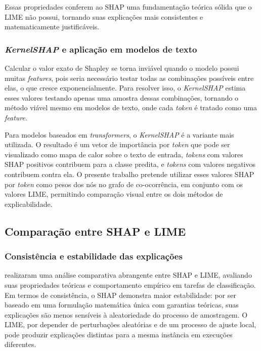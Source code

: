 \documentclass[
    12pt,                %
    openright,           %
    oneside,             %
    a4paper,             %
    english,             %
    brazil               %
]{abntex2}
\begin{document}
Essas propriedades conferem ao SHAP uma fundamentação teórica sólida que o LIME não possui, tornando suas explicações mais consistentes e matematicamente justificáveis.

\subsubsection{\textit{KernelSHAP} e aplicação em modelos de texto}
\label{subsubsec:shap_kernel}

Calcular o valor exato de Shapley se torna inviável quando o modelo 
possui muitas \textit{features}, pois seria necessário testar todas 
as combinações possíveis entre elas, o que cresce exponencialmente. 
Para resolver isso, o \textit{KernelSHAP} \cite{lundberg2017} estima 
esses valores testando apenas uma amostra dessas combinações, tornando 
o método viável mesmo em modelos de texto, onde cada \textit{token} 
é tratado como uma \textit{feature}.

Para modelos baseados em \textit{transformers}, o \textit{KernelSHAP} é a variante mais utilizada. O resultado é um vetor de importância por \textit{token} que pode ser visualizado como mapa de calor sobre o texto de entrada, \textit{tokens} com valores SHAP positivos contribuem para a classe predita, e \textit{tokens} com valores negativos contribuem contra ela. O presente trabalho pretende utilizar esses valores SHAP por \textit{token} como pesos dos nós no grafo de co-ocorrência, em conjunto com os valores LIME, permitindo comparação visual entre os dois métodos de explicabilidade.

\subsection{Comparação entre SHAP e LIME}
\label{subsec:shap_lime}

\subsubsection{Consistência e estabilidade das explicações}
\label{subsubsec:comparacao_consistencia}

 realizaram uma análise comparativa abrangente entre SHAP e LIME, avaliando suas propriedades teóricas e comportamento empírico em tarefas de classificação. Em termos de consistência, o SHAP demonstra maior estabilidade: por ser baseado em uma formulação matemática única com garantias teóricas, suas explicações são menos sensíveis à aleatoriedade do processo de amostragem. O LIME, por depender de perturbações aleatórias e de um processo de ajuste local, pode produzir explicações distintas para a mesma instância em execuções diferentes.
\end{document}
